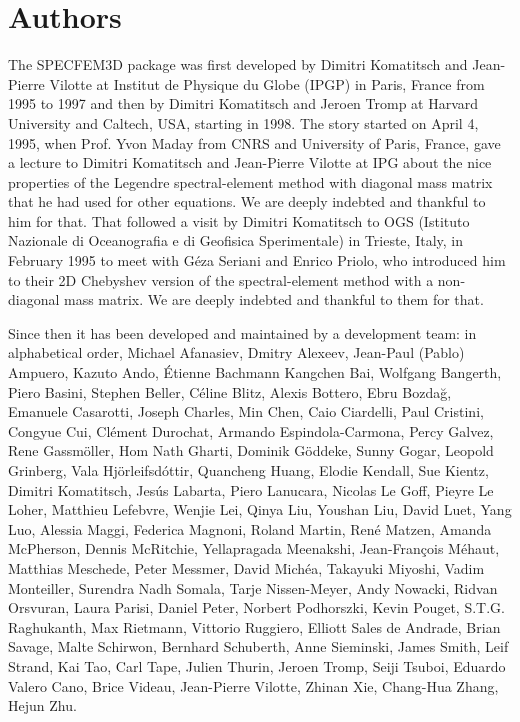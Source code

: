 \section*{Authors}

\noindent The SPECFEM3D package was first developed by Dimitri
Komatitsch and Jean-Pierre Vilotte at Institut de Physique du Globe
(IPGP) in Paris, France from 1995 to 1997 and then by Dimitri Komatitsch
and Jeroen Tromp at Harvard University and Caltech, USA, starting in 1998.
The story started on April 4, 1995, when Prof. Yvon Maday from CNRS and University of Paris, France, gave a lecture to
Dimitri Komatitsch and Jean-Pierre Vilotte at IPG about the nice properties of the Legendre spectral-element method with diagonal mass matrix that he had used for
other equations. We are deeply indebted and thankful to him for that.
That followed a visit by Dimitri Komatitsch to OGS (Istituto Nazionale di Oceanografia e di Geofisica Sperimentale) in Trieste, Italy, in February 1995
to meet with G\'eza Seriani and Enrico Priolo, who introduced him to their 2D Chebyshev version of the spectral-element method with a non-diagonal mass matrix.
We are deeply indebted and thankful to them for that.\newline

Since then it has been developed and maintained by a development team: in alphabetical order,
Michael Afanasiev,
Dmitry Alexeev,
Jean-Paul (Pablo) Ampuero,
Kazuto Ando,
\'Etienne Bachmann
Kangchen Bai,
Wolfgang Bangerth,
Piero Basini,
Stephen Beller,
C\'eline Blitz,
Alexis Bottero,
Ebru Bozda\u{g},
Emanuele Casarotti,
Joseph Charles,
Min Chen,
Caio Ciardelli,
Paul Cristini,
Congyue Cui,
Cl\'ement Durochat,
Armando Espindola-Carmona,
Percy Galvez,
Rene Gassm\"oller,
Hom Nath Gharti,
Dominik G\"oddeke,
Sunny Gogar,
Leopold Grinberg,
Vala Hj\"orleifsd\'ottir,
Quancheng Huang,
Elodie Kendall,
Sue Kientz,
Dimitri Komatitsch,
Jes\'us Labarta,
Piero Lanucara,
Nicolas Le Goff,
Pieyre Le Loher,
Matthieu Lefebvre,
Wenjie Lei,
Qinya Liu,
Youshan Liu,
David Luet,
Yang Luo,
Alessia Maggi,
Federica Magnoni,
Roland Martin,
Ren\'e Matzen,
Amanda McPherson,
Dennis McRitchie,
Yellapragada Meenakshi,
Jean-Fran\c{c}ois M\'ehaut,
Matthias Meschede,
Peter Messmer,
David Mich\'ea,
Takayuki Miyoshi,
Vadim Monteiller,
Surendra Nadh Somala,
Tarje Nissen-Meyer,
Andy Nowacki,
Ridvan Orsvuran,
Laura Parisi,
Daniel Peter,
Norbert Podhorszki,
Kevin Pouget,
S.T.G. Raghukanth,
Max Rietmann,
Vittorio Ruggiero,
Elliott Sales de Andrade,
Brian Savage,
Malte Schirwon,
Bernhard Schuberth,
Anne Sieminski,
James Smith,
Leif Strand,
Kai Tao,
Carl Tape,
Julien Thurin,
Jeroen Tromp,
Seiji Tsuboi,
Eduardo Valero Cano,
Brice Videau,
Jean-Pierre Vilotte,
Zhinan Xie,
Chang-Hua Zhang,
Hejun Zhu.\newline



